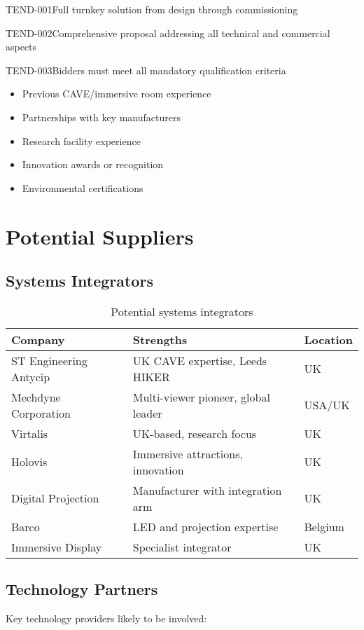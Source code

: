 \begin{requirement}{TEND-001}{Full turnkey solution from design through commissioning}
\begin{requirement}{TEND-002}{Comprehensive proposal addressing all technical and commercial aspects}
\begin{requirement}{TEND-003}{Bidders must meet all mandatory qualification criteria}
\begin{itemize}
    \item Previous CAVE/immersive room experience
    \item Partnerships with key manufacturers
    \item Research facility experience
    \item Innovation awards or recognition
    \item Environmental certifications
\end{itemize}

\section{Potential Suppliers}

\subsection{Systems Integrators}

\begin{table}[H]
\centering
\begin{tabularx}{\textwidth}{@{}lXl@{}}
\toprule
\textbf{Company} & \textbf{Strengths} & \textbf{Location} \\
\midrule
ST Engineering Antycip & UK CAVE expertise, Leeds HIKER & UK \\
Mechdyne Corporation & Multi-viewer pioneer, global leader & USA/UK \\
Virtalis & UK-based, research focus & UK \\
Holovis & Immersive attractions, innovation & UK \\
Digital Projection & Manufacturer with integration arm & UK \\
Barco & LED and projection expertise & Belgium \\
Immersive Display & Specialist integrator & UK \\
\bottomrule
\end{tabularx}
\caption{Potential systems integrators}
\end{table}

\subsection{Technology Partners}

Key technology providers likely to be involved:


\end{requirement}
\end{requirement}
\end{requirement}
